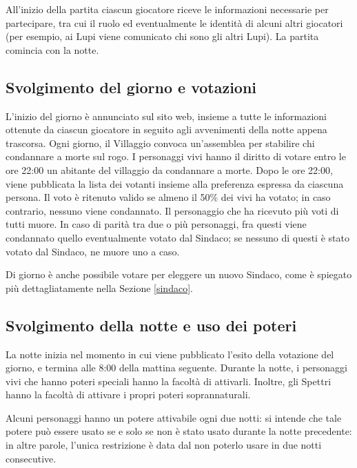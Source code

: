 \documentclass[a4paper,10pt]{article}
\begin{document}
All'inizio della partita ciascun giocatore riceve le informazioni necessarie per partecipare, tra cui il ruolo ed eventualmente le identità di alcuni altri giocatori (per esempio, ai Lupi viene comunicato chi sono gli altri Lupi). La partita comincia con la notte.

\subsection{Svolgimento del giorno e votazioni}

L'inizio del giorno è annunciato sul sito web, insieme a tutte le informazioni ottenute da ciascun giocatore in seguito agli avvenimenti della notte appena trascorsa. Ogni giorno, il Villaggio convoca un'assemblea per stabilire chi condannare a morte sul rogo. I personaggi vivi hanno il diritto di votare entro le ore 22:00 un abitante del villaggio da condannare a morte. Dopo le ore 22:00, viene pubblicata la lista dei votanti insieme alla preferenza espressa da ciascuna persona.
Il voto è ritenuto valido se almeno il 50\% dei vivi ha votato; in caso contrario, nessuno viene condannato. Il personaggio che ha ricevuto più voti di tutti muore.
In caso di parità tra due o più personaggi, fra questi viene condannato quello eventualmente votato dal Sindaco; se nessuno di questi è stato votato dal Sindaco, ne muore uno a caso.

Di giorno è anche possibile votare per eleggere un nuovo Sindaco, come è spiegato più dettagliatamente nella Sezione \ref{sindaco}.


\subsection{Svolgimento della notte e uso dei poteri}

La notte inizia nel momento in cui viene pubblicato l'esito della votazione del giorno, e termina alle 8:00 della mattina seguente. Durante la notte, i personaggi vivi che hanno poteri speciali hanno la facoltà di attivarli. Inoltre, gli Spettri hanno la facoltà di attivare i propri poteri soprannaturali.

Alcuni personaggi hanno un potere attivabile ogni due notti: si intende che tale potere può essere usato se e solo se non è stato usato durante la notte precedente: in altre parole, l'unica restrizione è data dal non poterlo usare in due notti consecutive.
\end{document}
